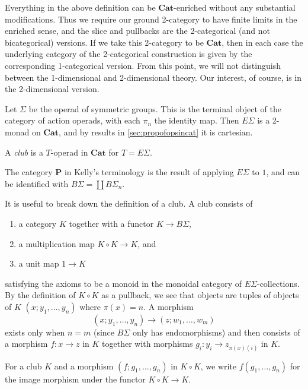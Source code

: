 \documentclass{amsbook} %
\newcommand{\mb}{\mathbf}
\numberwithin{section}{chapter}
\begin{document}
\begin{rem}
Everything in the above definition can be $\mb{Cat}$-enriched without any substantial modifications.  Thus we require our ground 2-category to have finite limits in the enriched sense, and the slice and pullbacks are the 2-categorical (and not bicategorical) versions.  If we take this 2-category to be $\mb{Cat}$, then in each case the underlying category of the 2-categorical construction is given by the corresponding 1-categorical version.  From this point, we will not distinguish between the 1-dimensional and 2-dimensional theory.  Our interest, of course, is in the 2-dimensional version.
\end{rem}

Let $\Sigma$ be the operad of symmetric groups.  This is the terminal object of the category of action operads, with each $\pi_{n}$ the identity map.  Then $E\Sigma$ is a 2-monad on $\mb{Cat}$, and by results in \cref{sec:propofopsincat} it is cartesian.

\begin{Defi}
A \textit{club} is a $T$-operad in $\mb{Cat}$ for $T = E\Sigma$.
\end{Defi}

\begin{rem}
The category $\mb{P}$ in Kelly's terminology is the result of applying $E\Sigma$ to $1$, and can be identified with $B\Sigma = \coprod B\Sigma_{n}$.
\end{rem}

It is useful to break down the definition of a club.  A club consists of
\begin{enumerate}
\item a category $K$ together with a functor $K \rightarrow B \Sigma$,
\item a multiplication map $K \circ K \rightarrow K$, and
\item a unit map $1 \rightarrow K$
\end{enumerate}
satisfying the axioms to be a monoid in the monoidal category of $E\Sigma$-collections.  By the definition of $K \circ K$ as a pullback, we see that objects are tuples of objects of $K$ $(x; y_{1}, \ldots, y_{n})$ where $\pi(x) = n$.  A morphism
\[
(x; y_{1}, \ldots, y_{n}) \to (z; w_{1}, \ldots, w_{m})
\]
exists only when $n=m$ (since $B\Sigma$ only has endomorphisms) and then consists of a morphism $f:x \to z$ in $K$ together with morphisms $g_{i}:y_{i} \to z_{\pi(x)(i)}$ in $K$.

\begin{nota}\label{nota:clubmult}
For a club $K$ and a morphism $(f; g_{1}, \ldots, g_{n})$ in $K \circ K$, we write $f(g_{1}, \ldots, g_{n})$ for the image morphism under the functor $K \circ K \rightarrow K$.
\end{nota}
\end{document}
